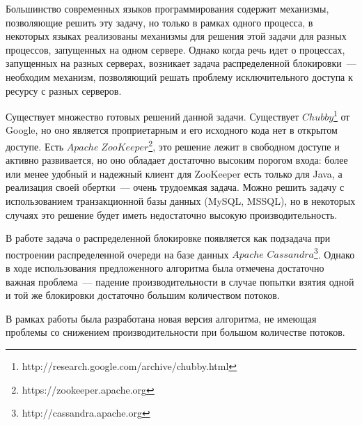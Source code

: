 Большинство современных языков программирования содержит механизмы, позволяющие решить эту задачу, но только в рамках одного процесса, в некоторых языках реализованы механизмы для решения этой задачи для разных процессов, запущенных на одном сервере. Однако когда речь идет о процессах, запущенных на разных серверах, возникает задача распределенной блокировки~--- необходим механизм, позволяющий решать проблему исключительного доступа к ресурсу с разных серверов.

Существует множество готовых решений данной задачи. Существует $Chubby$\footnote{http://research.google.com/archive/chubby.html} от Google, но оно является проприетарным и его исходного кода нет в открытом доступе. Есть $Apache\;ZooKeeper$\footnote{https://zookeeper.apache.org}, это решение лежит в свободном доступе и активно развивается, но оно обладает достаточно высоким порогом входа: более или менее удобный и надежный клиент для ZooKeeper есть только для Java, а реализация своей обертки~--- очень трудоемкая задача. Можно решить задачу с использованием транзакционной базы данных (MySQL, MSSQL), но в некоторых случаях это решение будет иметь недостаточно высокую производительность.

В работе \cite{fedor} задача о распределенной блокировке появляется как подзадача при построении распределенной очереди на базе данных $Apache$ $Cassandra$\footnote{http://cassandra.apache.org}. Однако в ходе использования предложенного алгоритма была отмечена достаточно важная проблема~--- падение производительности в случае попытки взятия одной и той же блокировки достаточно большим количеством потоков.

В рамках работы была разработана новая версия алгоритма, не имеющая проблемы со снижением производительности при большом количестве потоков.
